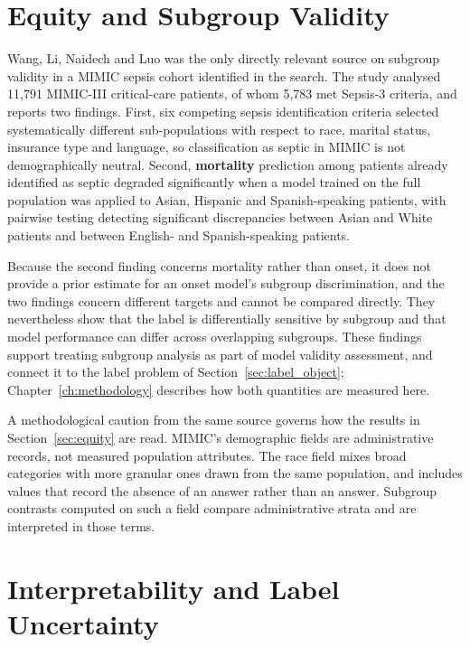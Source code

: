 \section{Equity and Subgroup Validity}
\label{sec:equity_lit}

Wang, Li, Naidech and Luo \cite{wang2022equity} was the only directly relevant
source on subgroup validity in a MIMIC sepsis cohort identified in the search.
The study analysed 11,791 MIMIC-III critical-care patients, of whom 5,783 met
Sepsis-3 criteria, and reports two findings. First, six competing sepsis
identification criteria selected systematically different sub-populations with
respect to race, marital status, insurance type and language, so
classification as septic in MIMIC is not demographically neutral. Second,
\textbf{mortality} prediction among patients already identified as septic
degraded significantly when a model trained on the full population was applied
to Asian, Hispanic and Spanish-speaking patients, with pairwise testing
detecting significant discrepancies between Asian and White patients and
between English- and Spanish-speaking patients.

Because the second finding concerns mortality rather than onset, it does not
provide a prior estimate for an onset model's subgroup discrimination, and the
two findings concern different targets and cannot be compared directly. They
nevertheless show that the label is differentially sensitive by subgroup and
that model performance can differ across overlapping subgroups. These findings
support treating subgroup analysis as part of model validity assessment, and
connect it to the label problem of Section~\ref{sec:label_object};
Chapter~\ref{ch:methodology} describes how both quantities are measured here.

A methodological caution from the same source governs how the results in
Section~\ref{sec:equity} are read. MIMIC's demographic fields are
administrative records, not measured population attributes. The race field
mixes broad categories with more granular ones drawn from the same population,
and includes values that record the absence of an answer rather than an
answer. Subgroup contrasts computed on such a field compare administrative
strata and are interpreted in those terms.


\section{Interpretability and Label Uncertainty}
\label{sec:interpretability_survives}

